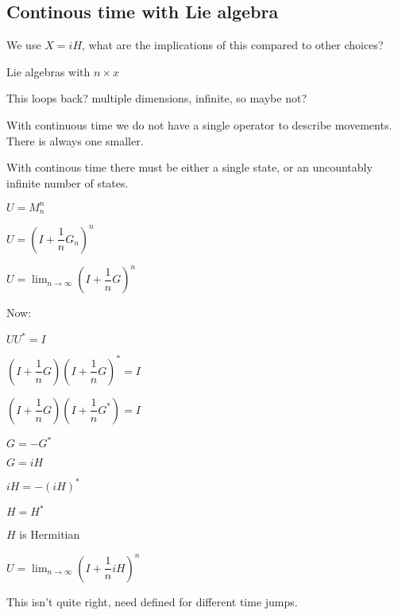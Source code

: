 
\subsection{Continous time with Lie algebra}

We use \(X=iH\), what are the implications of this compared to other choices?

Lie algebras with \(n\times x\)

This loops back? multiple dimensions, infinite, so maybe not?

With continuous time we do not have a single operator to describe movements. There is always one smaller.

With continous time there must be either a single state, or an uncountably infinite number of states.

\(U=M_n^n\)

\(U=(I+\dfrac{1}{n}G_n)^n\)

\(U=\lim_{n\rightarrow \infty }(I+\dfrac{1}{n}G)^n\)

Now:

\(UU^*=I\)

\((I+\dfrac{1}{n}G)(I+\dfrac{1}{n}G)^*=I\)

\((I+\dfrac{1}{n}G)(I+\dfrac{1}{n}G^*)=I\)

\(G=-G^*\)

\(G=iH\)

\(iH=-(iH)^*\)

\(H=H^*\)

\(H\) is Hermitian

\(U=\lim_{n\rightarrow \infty }(I+\dfrac{1}{n}iH)^n\)

This isn't quite right, need defined for different time jumps.

